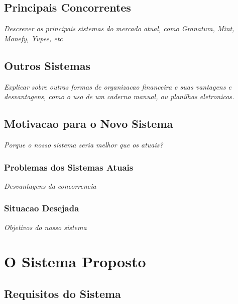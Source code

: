 \documentclass[a4paper,article]{abnt}
\begin{document}
\section{Principais Concorrentes}
\emph{Descrever os principais sistemas do mercado atual, como Granatum, Mint, Monefy, Yupee, etc}

\section{Outros Sistemas}
\emph{Explicar sobre outras formas de organizacao financeira e suas vantagens e desvantagens, como o uso de um caderno manual, ou planilhas eletronicas.}

\section{Motivacao para o Novo Sistema}
\emph{Porque o nosso sistema seria melhor que os atuais?}

\subsection{Problemas dos Sistemas Atuais}
\emph{Desvantagens da concorrencia}

\subsection{Situacao Desejada}
\emph{Objetivos do nosso sistema}

\chapter{O Sistema Proposto}

\section{Requisitos do Sistema}
\end{document}
